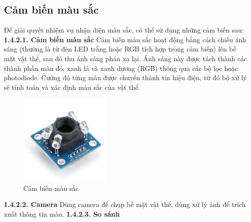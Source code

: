     \subsection{Cảm biến màu sắc}
    Để giải quyết nhiệm vụ nhận diện màu sắc, có thể sử dụng những cảm biến sau:
    \newline
    \textbf{1.4.2.1. Cảm biến màu sắc}
    \newline
    \hspace*{0.6cm} Cảm biến màu sắc hoạt động bằng cách chiếu ánh sáng (thường là từ đèn LED trắng hoặc RGB tích hợp trong cảm biến) lên bề mặt vật thể, 
    sau đó thu ánh sáng phản xạ lại. Ánh sáng này được tách thành các thành phần màu đỏ, xanh lá và xanh dương (RGB) thông 
    qua các bộ lọc hoặc photodiode. Cường độ từng màu được chuyển thành tín hiệu điện, từ đó bộ xử lý sẽ tính toán và xác định màu sắc của vật thể.
    \begin{figure}[H]
        \centering
        \includegraphics[width=0.4\textwidth]{pictures/chapter1/chapter1_pic18_color_sensor.png}
        \caption{Cảm biến màu sắc}
        \label{chap1_pic18}
    \end{figure}
    \textbf{1.4.2.2. Camera}
    \newline
    \hspace*{0.6cm} Dùng camera để chụp bề mặt vật thể, dùng xử lý ảnh để trích xuất thông tin màu.
    \newline
    \textbf{1.4.2.3. So sánh}
